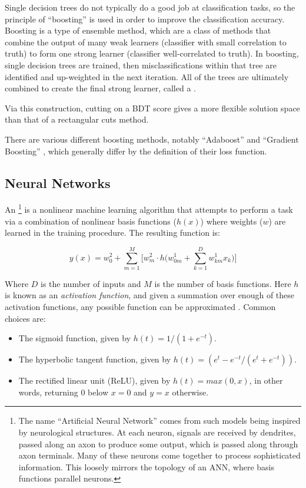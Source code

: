 Single decision trees do not typically do a good job at classification tasks, so the principle of ``boosting'' is used in order to improve the classification accuracy. Boosting is a type of ensemble method, which are a class of methods that combine the output of many weak learners (classifier with small correlation to truth) to form one strong learner (classifier well-correlated to truth). In boosting, single decision trees are trained, then misclassifications within that tree are identified and up-weighted in the next iteration. All of the trees are ultimately combined to create the final strong learner, called a . 

Via this construction, cutting on a \gls{BDT} score gives a more flexible solution space than that of a rectangular cuts method.

There are various different boosting methods, notably ``Adaboost'' \cite{adaboost} and ``Gradient Boosting'' \cite{gradBoost}, which generally differ by the definition of their loss function.


\subsection{Neural Networks}

An \footnote{The name ``Artificial Neural Network'' comes from such models being inspired by neurological structures. At each neuron, signals are received by dendrites, passed along an axon to produce some output, which is passed along through axon terminals. Many of these neurons come together to process sophisticated information. This loosely mirrors the topology of an \gls{ANN}, where basis functions parallel neurons.} is a nonlinear machine learning algorithm that attempts to perform a task via a combination of nonlinear basis functions ($h(x)$) where weights ($w$) are learned in the training procedure. The resulting function is:

\begin{equation}
    y(x) = w_0^2 + \sum_{m=1}^{M} \big [w_m^2 \cdot h \big (w_{0m}^1 + \sum_{k=1}^{D} w_{km}^1 x_k) ]
\end{equation}

Where $D$ is the number of inputs and $M$ is the number of basis functions. Here $h$ is known as an \textit{activation function}, and given a summation over enough of these activation functions, any possible function can be approximated \cite{nn-basis}. Common choices are:
\begin{itemize}
    \item The sigmoid function, given by $h(t) = 1/(1+e^{-t})$.
    \item The hyperbolic tangent function, given by $h(t) = (e^t - e^{-t}/(e^t + e^{-t}))$.
    \item The rectified linear unit (ReLU), given by $h(t)=max(0,x)$, in other words, returning 0 below $x=0$ and $y=x$ otherwise.
\end{itemize}

